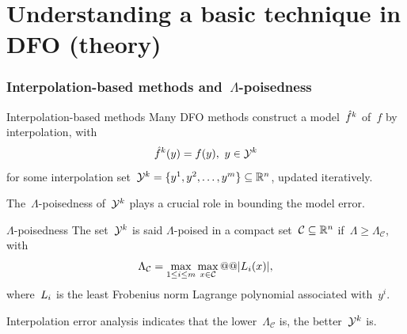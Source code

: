 \documentclass{polyu-presentation}
\newcommand{\iter}[1][]{x\ifthenelse{\equal{#1}{}}{}{^{#1}}}
\newcommand{\lagp}[1][]{L\ifthenelse{\equal{#1}{}}{}{_{#1}}}
\newcommand{\obj}{f}
\newcommand{\objm}[1][]{\hat{f}\ifthenelse{\equal{#1}{}}{}{^{#1}}}
\newcommand{\xpt}[1][]{\mathcal{Y}\ifthenelse{\equal{#1}{}}{}{^{#1}}}
\begin{document}
\section{Understanding a basic technique in DFO (\textbf{theory})}

\begin{frame}
    \frametitle{Interpolation-based methods and~$\Lambda$-poisedness}
    
    \begin{block}{Interpolation-based methods}
        Many DFO methods construct a \alert{model}~$\objm[k]$ of~$\obj$ by \alert{interpolation}, with
        \setlength{\abovedisplayskip}{8pt}
        \setlength{\belowdisplayskip}{8pt}
        \begin{equation*}
            \objm[k](y) = \obj(y), ~ y \in \xpt[k]
        \end{equation*}
        for some \alert{interpolation set}~$\xpt[k] = \set{y^1, y^2, \dots, y^m} \subseteq \R^n$, updated iteratively.
    \end{block}

    The~\alert{$\Lambda$-poisedness} of~$\xpt[k]$ plays a crucial role in bounding the model error.

    \begin{block}{$\Lambda$-poisedness \parencite{Conn_Scheinberg_Vicente_2009b}}
        The set~$\xpt[k]$ is said \alert{$\Lambda$-poised} in a compact set~$\mathcal{C} \subseteq \mathbb{R}^n$ if~$\Lambda \ge \Lambda_{\mathcal{C}}$, with
        \setlength{\abovedisplayskip}{8pt}
        \setlength{\belowdisplayskip}{8pt}
        \begin{equation*}
            \Lambda_{\mathcal{C}} = \max_{1 \le i \le m} \max_{\iter \in \mathcal{C}} @@ \abs{\lagp[i](\iter)},
        \end{equation*}
        where~$\lagp[i]$ is the least Frobenius norm \alert{Lagrange polynomial} associated with~$y^i$.
    \end{block}

    Interpolation error analysis indicates that the \alert{lower}~$\Lambda_{\mathcal{C}}$ is, the \alert{better}~$\xpt[k]$ is.
\end{frame}
\end{document}
